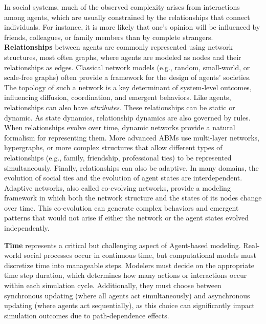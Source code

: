 \documentclass[11pt]{article}
\begin{document}
\smallskip \noindent In social systems, much of the observed complexity arises from interactions among agents, which are usually constrained by the relationships that connect individuals. 
For instance, it is more likely that one's opinion will be influenced by friends, colleagues, or family members than by complete strangers. 
\textbf{Relationships} between agents are commonly represented using network structures, most often graphs, where agents are modeled as nodes and their relationships as edges. 
Classical network models (e.g., random, small-world, or scale-free graphs) often provide a framework for the design of agents' societies. 
The topology of such a network is a key determinant of system-level outcomes, influencing diffusion, coordination, and emergent behaviors.
Like agents, relationships can also have \textit{attributes}.
These relationships can be static or dynamic. 
As state dynamics, relationship dynamics are also governed by rules. When relationships evolve over time, dynamic networks provide a natural formalism for representing them.
More advanced ABMs use multi-layer networks, hypergraphs, or more complex structures that allow different types of relationships (e.g., family, friendship, professional ties) to be represented simultaneously. 
Finally, relationships can also be adaptive. 
In many domains, the evolution of social ties and the evolution of agent states are interdependent. Adaptive networks, also called co-evolving networks, provide a modeling framework in which both the network structure and the states of its nodes change over time. 
This co-evolution can generate complex behaviors and emergent patterns that would not arise if either the network or the agent states evolved independently. 

\smallskip \noindent \textbf{Time} represents a critical but challenging aspect of Agent-based modeling. 
Real-world social processes occur in continuous time, but computational models must discretize time into manageable steps. 
Modelers must decide on the appropriate time step duration, which determines how many actions or interactions occur within each simulation cycle. 
Additionally, they must choose between synchronous updating (where all agents act simultaneously) and asynchronous updating (where agents act sequentially), as this choice can significantly impact simulation outcomes due to path-dependence effects.
\end{document}
